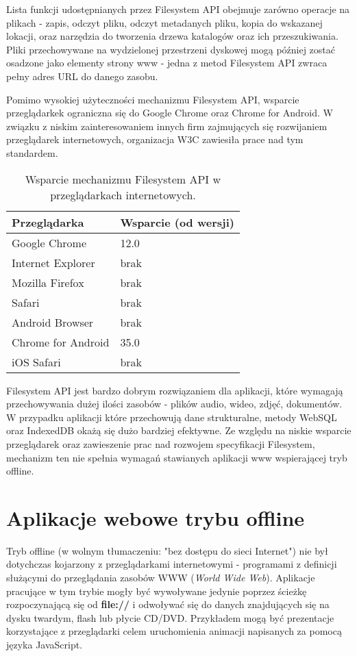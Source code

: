 Lista funkcji udostępnianych przez Filesystem API obejmuje zarówno operacje na plikach - zapis, odczyt pliku, odczyt metadanych pliku, kopia do wskazanej lokacji, oraz narzędzia do tworzenia drzewa katalogów oraz ich przeszukiwania. Pliki przechowywane na wydzielonej przestrzeni dyskowej mogą później zostać osadzone jako elementy strony www - jedna z metod Filesystem API zwraca pełny adres URL do danego zasobu.

Pomimo wysokiej użyteczności mechanizmu Filesystem API, wsparcie przeglądarkek ograniczna się do Google Chrome oraz Chrome for Android. W związku z niskim zainteresowaniem innych firm zajmujących się rozwijaniem przeglądarek internetowych, organizacja W3C zawiesiła prace nad tym standardem.

\begin{table}[h]
\centering
    \begin{tabular}{ | p{8cm} | p{6cm} | }
    \hline
    \textbf{Przeglądarka} & \textbf{Wsparcie (od wersji)} \\ \hline
	Google Chrome & 12.0
	\\ \hline
	Internet Explorer & brak
	\\ \hline
	Mozilla Firefox & brak
	\\ \hline
	Safari & brak
	\\ \hline
	Android Browser & brak
	\\ \hline
	Chrome for Android & 35.0
	\\ \hline
	iOS Safari & brak
	\\ \hline
    \end{tabular}
	\caption{Wsparcie mechanizmu Filesystem API w przeglądarkach internetowych.}
\end{table}

Filesystem API jest bardzo dobrym rozwiązaniem dla aplikacji, które wymagają przechowywania dużej ilości zasobów - plików audio, wideo, zdjęć, dokumentów. W przypadku aplikacji które przechowują dane strukturalne, metody WebSQL oraz IndexedDB okażą się dużo bardziej efektywne. Ze względu na niskie wsparcie przeglądarek oraz zawieszenie prac nad rozwojem specyfikacji Filesystem, mechanizm ten nie spełnia wymagań stawianych aplikacji www wspierającej tryb offline.

\section{Aplikacje webowe trybu offline}
\label{sec:appWebOff}

Tryb offline\cite{whatOffline} (w wolnym tłumaczeniu: "bez dostępu do sieci Internet") nie był dotychczas kojarzony z przeglądarkami internetowymi - programami z definicji służącymi do przeglądania zasobów WWW (\emph{World Wide Web}). Aplikacje pracujące w tym trybie mogły być wywoływane jedynie poprzez ścieżkę rozpoczynającą się od \textbf{file://} i odwoływać się do danych znajdujących się na dysku twardym, flash lub płycie CD/DVD. Przykładem mogą być prezentacje korzystające z przeglądarki celem uruchomienia animacji napisanych za pomocą języka JavaScript.

